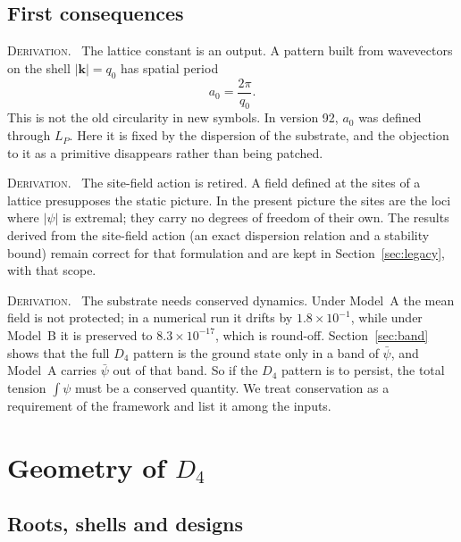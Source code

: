 \documentclass[a4paper,11pt]{article}
\makeatletter
\numberwithin{equation}{section}
\theoremstyle{jsplain}
\theoremstyle{jsrem}
\newcommand{\lbl}[1]{\textcolor{lbl@#1}{\textsc{#1}}.\ }
\makeatother
\begin{document}
\subsection{First consequences}

\lbl{Derivation} The lattice constant is an output. A pattern built from wavevectors on the shell $|\mathbf{k}|=q_0$ has spatial period
\begin{equation}\label{eq:a0}
a_0=\frac{2\pi}{q_0}.
\end{equation}
This is not the old circularity in new symbols. In version 92, $a_0$ was defined through $L_P$. Here it is fixed by the dispersion of the substrate, and the objection to it as a primitive disappears rather than being patched.

\lbl{Derivation} The site-field action is retired. A field defined at the sites of a lattice presupposes the static picture. In the present picture the sites are the loci where $|\psi|$ is extremal; they carry no degrees of freedom of their own. The results derived from the site-field action (an exact dispersion relation and a stability bound) remain correct for that formulation and are kept in Section~\ref{sec:legacy}, with that scope.

\lbl{Derivation} The substrate needs conserved dynamics. Under Model~A the mean field is not protected; in a numerical run it drifts by $1.8\times10^{-1}$, while under Model~B it is preserved to $8.3\times10^{-17}$, which is round-off. Section~\ref{sec:band} shows that the full $D_4$ pattern is the ground state only in a band of $\bar\psi$, and Model~A carries $\bar\psi$ out of that band. So if the $D_4$ pattern is to persist, the total tension $\int\psi$ must be a conserved quantity. We treat conservation as a requirement of the framework and list it among the inputs.

\section{Geometry of $D_4$}\label{sec:geometry}

\subsection{Roots, shells and designs}
\end{document}

